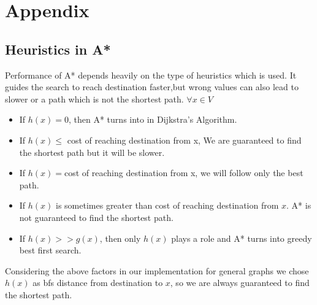 \documentclass[a4paper]{article}
\begin{document}
\newpage 
    \section{Appendix} 
    \subsection{Heuristics in A*}
     Performance of A* depends heavily on the type of heuristics which is used. It guides the search to reach destination faster,but wrong values can also lead to slower or a path which is not the shortest path.
     $\forall x \in V$
     \begin{itemize}
         \item If $h(x)=0$, then A* turns into in Dijkstra's Algorithm.
         \item If $h(x) \leq$ cost of reaching destination from x, We are guaranteed to find the shortest path but it will be slower.
         \item If $h(x) = $cost of reaching destination from x, we will follow only the best path.
         \item If $h(x)$ is sometimes greater than cost of reaching destination from $x$. A* is not guaranteed to find the shortest path.
         \item If $h(x)>> g(x)$, then only $h(x)$ plays a role and A* turns into greedy best first search.
     \end{itemize}
    Considering the above factors in our implementation for general graphs we chose $h(x)$ as bfs distance from destination to $x$, so we are always guaranteed to find the shortest path.
    

\end{document}
